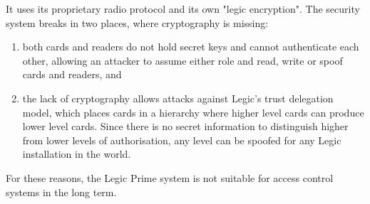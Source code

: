 It uses its proprietary radio protocol and its own "legic encryption". The security system breaks in two places, where cryptography is missing:

\begin{enumerate}
    \item both cards and readers do not hold secret keys and cannot authenticate each other, allowing an attacker to assume either role and read, write or spoof cards and readers, and
    \item the lack of cryptography allows attacks against Legic's trust delegation model, which places cards in a hierarchy where higher level cards can produce lower level cards. Since there is no secret information to distinguish higher from lower levels of authorisation, any level can be spoofed for any Legic installation in the world.
\end{enumerate}
For these reasons, the Legic Prime system is not suitable for access control systems in the long term.~\cite{srlabsLegicPrime}



